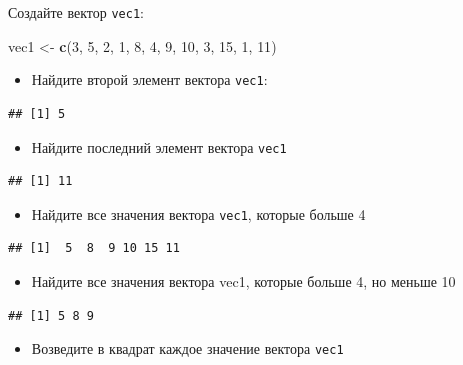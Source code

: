 \documentclass[]{book}
\newenvironment{Shaded}{\begin{snugshade}}{\end{snugshade}}
\newcommand{\KeywordTok}[1]{\textcolor[rgb]{0.13,0.29,0.53}{\textbf{#1}}}
\newcommand{\DecValTok}[1]{\textcolor[rgb]{0.00,0.00,0.81}{#1}}
\newcommand{\StringTok}[1]{\textcolor[rgb]{0.31,0.60,0.02}{#1}}
\newcommand{\NormalTok}[1]{#1}
\providecommand{\tightlist}{%
  \setlength{\itemsep}{0pt}\setlength{\parskip}{0pt}}
\begin{document}
Создайте вектор \texttt{vec1}:

\begin{Shaded}
\begin{Highlighting}[]
\NormalTok{vec1 <-}\StringTok{ }\KeywordTok{c}\NormalTok{(}\DecValTok{3}\NormalTok{, }\DecValTok{5}\NormalTok{, }\DecValTok{2}\NormalTok{, }\DecValTok{1}\NormalTok{, }\DecValTok{8}\NormalTok{, }\DecValTok{4}\NormalTok{, }\DecValTok{9}\NormalTok{, }\DecValTok{10}\NormalTok{, }\DecValTok{3}\NormalTok{, }\DecValTok{15}\NormalTok{, }\DecValTok{1}\NormalTok{, }\DecValTok{11}\NormalTok{)}
\end{Highlighting}
\end{Shaded}

\begin{itemize}
\tightlist
\item
  Найдите второй элемент вектора \texttt{vec1}:
\end{itemize}

\begin{verbatim}
## [1] 5
\end{verbatim}

\begin{itemize}
\tightlist
\item
  Найдите последний элемент вектора \texttt{vec1}
\end{itemize}

\begin{verbatim}
## [1] 11
\end{verbatim}

\begin{itemize}
\tightlist
\item
  Найдите все значения вектора \texttt{vec1}, которые больше 4
\end{itemize}

\begin{verbatim}
## [1]  5  8  9 10 15 11
\end{verbatim}

\begin{itemize}
\tightlist
\item
  Найдите все значения вектора vec1, которые больше 4, но меньше 10
\end{itemize}

\begin{verbatim}
## [1] 5 8 9
\end{verbatim}

\begin{itemize}
\tightlist
\item
  Возведите в квадрат каждое значение вектора \texttt{vec1}
\end{itemize}
\end{document}
